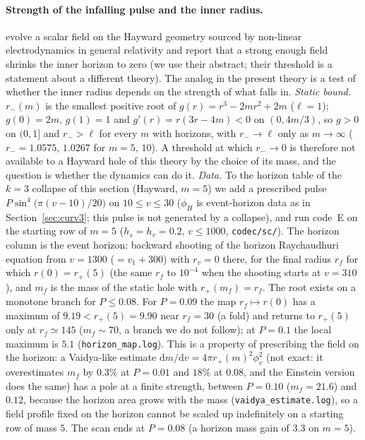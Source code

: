 \documentclass[11pt]{article}
\begin{document}
\paragraph{Strength of the infalling pulse and the inner radius.} \citet{ShaoGuoTianZhang2025} evolve a scalar field on the Hayward geometry sourced by non-linear electrodynamics in general relativity and report that a strong enough field shrinks the inner horizon to zero (we use their abstract; their threshold is a statement about a different theory). The analog in the present theory is a test of whether the inner radius depends on the strength of what falls in. \emph{Static bound.} $r_-(m)$ is the smallest positive root of $g(r)=r^{3}-2mr^{2}+2m$ ($\ell=1$); $g(0)=2m$, $g(1)=1$ and $g'(r)=r(3r-4m)<0$ on $(0,4m/3)$, so $g>0$ on $(0,1]$ and $r_->\ell$ for every $m$ with horizons, with $r_-\to\ell$ only as $m\to\infty$ ($r_-=1.0575,\,1.0267$ for $m=5,\,10$). A threshold at which $r_-\to0$ is therefore not available to a Hayward hole of this theory by the choice of its mass, and the question is whether the dynamics can do it. \emph{Data.} To the horizon table of the $k=3$ collapse of this section (Hayward, $m=5$) we add a prescribed pulse $P\sin^{4}\bigl(\pi(v-10)/20\bigr)$ on $10\le v\le30$ ($\phi_H$ is event-horizon data as in Section~\ref{sec:curv3}; this pulse is not generated by a collapse), and run code~E on the starting row of $m=5$ ($h_s=h_v=0.2$, $v\le1000$, \texttt{codec/sc/}). The horizon column is the event horizon: backward shooting of the horizon Raychaudhuri equation from $v=1300$ ($=v_1+300$) with $r_v=0$ there, for the final radius $r_f$ for which $r(0)=r_+(5)$ (the same $r_f$ to $10^{-4}$ when the shooting starts at $v=310$), and $m_f$ is the mass of the static hole with $r_+(m_f)=r_f$. The root exists on a monotone branch for $P\le0.08$. For $P=0.09$ the map $r_f\mapsto r(0)$ has a maximum of $9.19<r_+(5)=9.90$ near $r_f=30$ (a fold) and returns to $r_+(5)$ only at $r_f\simeq145$ ($m_f\sim70$, a branch we do not follow); at $P=0.1$ the local maximum is $5.1$ (\texttt{horizon\_map.log}). This is a property of prescribing the field on the horizon: a Vaidya-like estimate $\mathrm dm/\mathrm dv=4\pi r_+(m)^{2}\phi_v^{2}$ (not exact: it overestimates $m_f$ by $0.3\%$ at $P=0.01$ and $18\%$ at $0.08$, and the Einstein version does the same) has a pole at a finite strength, between $P=0.10$ ($m_f=21.6$) and $0.12$, because the horizon area grows with the mass (\texttt{vaidya\_estimate.log}), so a field profile fixed on the horizon cannot be scaled up indefinitely on a starting row of mass $5$. The scan ends at $P=0.08$ (a horizon mass gain of $3.3$ on $m=5$).
\end{document}
